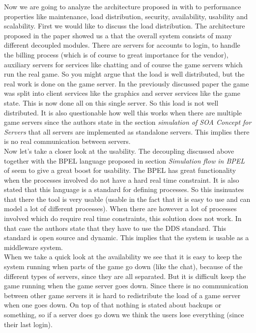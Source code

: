 \noindent Now we are going to analyze the architecture proposed in \cite{service} with to performance properties like maintenance, load distribution, security, availability, usability and scalability. 
First we would like to discuss the load distribution. 
The architecture proposed in the paper showed us a that the overall system consists of many different decoupled modules. 
There are servers for accounts to login, to handle the billing process (which is of course to great importance for the vendor), auxiliary servers for services like chatting and of course the game servers which run the real game. 
So you might argue that the load is well distributed, but the real work is done on the game server. 
In the previously discussed paper the game was split into client services like the graphics and server services like the game state. 
This is now done all on this single server. 
So this load is not well distributed. 
It is also questionable how well this works when there are multiple game servers since the authors state in the section \emph{simulation of SOA Concept for Servers} that all servers are implemented as standalone servers. 
This implies there is no real communication between servers. \\
\indent Now let’s take a closer look at the usability. 
The decoupling discussed above together with the BPEL language proposed in section \emph{Simulation flow in BPEL} of \cite{service} seem to give a great boost for usability. 
The BPEL has great functionality when the processes involved do not have a hard real time constraint. 
It is also stated that this language is a standard for defining processes. 
So this insinuates that there the tool is very usable (usable in the fact that it is easy to use and can model a lot of different processes). 
When there are however a lot of processes involved which do require real time constraints, this solution does not work. 
In that case the authors state that they have to use the DDS standard. 
This standard is open source and dynamic. 
This implies that the system is usable as a middleware system.\\
\indent When we take a quick look at the availability we see that it is easy to keep the system running when parts of the game go down (like the chat), because of the different types of servers, since they are all separated. 
But it is difficult keep the game running when the game server goes down. 
Since there is no communication between other game servers it is hard to redistribute the load of a game server when one goes down. 
On top of that nothing is stated about backups or something, so if a server does go down we think the users lose everything (since their last login). \\
